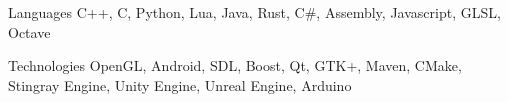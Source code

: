 


\begin{cvskills}


\cvskill
{Languages} %
{C++, C, Python, Lua, Java, Rust, C\#, Assembly, Javascript, GLSL, Octave } %


\cvskill
{Technologies}
    {OpenGL, Android, SDL, Boost, Qt, GTK+, Maven, CMake, Stingray Engine, Unity Engine, Unreal Engine, Arduino }



\end{cvskills}
